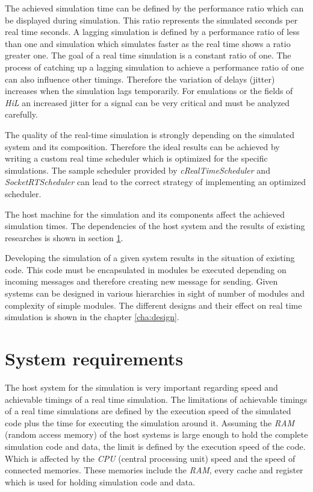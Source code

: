 The achieved simulation time can be defined by the performance ratio which can be displayed during simulation.
This ratio represents the simulated seconds per real time seconds.
A lagging simulation is defined by a performance ratio of less than one and simulation which simulates faster as the real time shows a ratio greater one.
The goal of a real time simulation is a constant ratio of one.
The process of catching up a lagging simulation to achieve a performance ratio of one can also influence other timings.
Therefore the variation of delays (jitter) increases when the simulation lags temporarily.
For emulations or the fields of \emph{HiL} an increased jitter for a signal can be very critical and must be analyzed carefully.

The quality of the real-time simulation is strongly depending on the simulated system and its composition.
Therefore the ideal results can be achieved by writing a custom real time scheduler which is optimized for the specific simulations.
The sample scheduler provided by \emph{cRealTimeScheduler} and \emph{SocketRTScheduler} can lead to the correct strategy of implementing an optimized scheduler.

The host machine for the simulation and its components affect the achieved simulation times.
The dependencies of the host system and the results of existing researches is shown in section \ref{sec:simulation_requirements}.

Developing the simulation of a given system results in the situation of existing code.
This code must be encapsulated in modules be executed depending on incoming messages and therefore creating new message for sending.
Given systems can be designed in various hierarchies in sight of number of modules and complexity of simple modules.
The different designs and their effect on real time simulation is shown in the chapter \ref{cha:design}.

\section{System requirements}
\label{sec:simulation_requirements}
The host system for the simulation is very important regarding speed and achievable timings of a real time simulation.
The limitations of achievable timings of a real time simulations are defined by the execution speed of the simulated code plus the time for executing the simulation around it.
Assuming the \emph{RAM} (random access memory) of the host systems is large enough to hold the complete simulation code and data, the limit is defined by the execution speed of the code.
Which is affected by the \emph{CPU} (central processing unit) speed and the speed of connected memories.
These memories include the \emph{RAM}, every cache and register which is used for holding simulation code and data.
